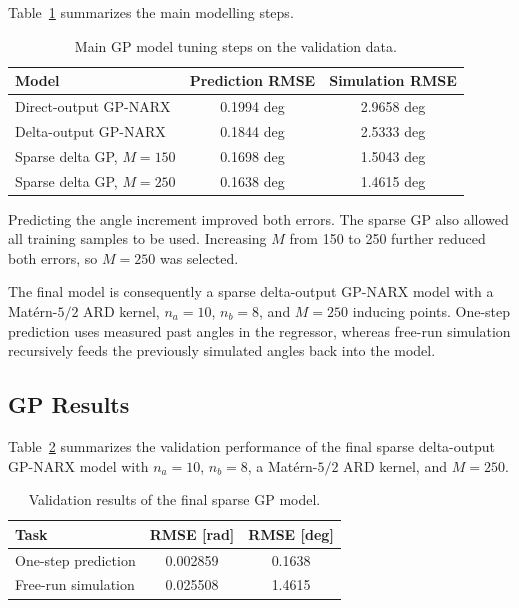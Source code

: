 Table~\ref{tab:gp_tuning} summarizes the main modelling steps.

\begin{table}[htbp]
\caption{Main GP model tuning steps on the validation data.}
\centering
\begin{tabular}{lcc}
\toprule
Model & Prediction RMSE & Simulation RMSE \\
\midrule
Direct-output GP-NARX & 0.1994 deg & 2.9658 deg \\
Delta-output GP-NARX & 0.1844 deg & 2.5333 deg \\
Sparse delta GP, \(M=150\) & 0.1698 deg & 1.5043 deg \\
Sparse delta GP, \(M=250\) & 0.1638 deg & 1.4615 deg \\
\bottomrule
\end{tabular}
\label{tab:gp_tuning}
\end{table}

Predicting the angle increment improved both errors. The sparse GP also
allowed all training samples to be used. Increasing \(M\) from 150 to
250 further reduced both errors, so \(M=250\) was selected.

The final model is consequently a sparse delta-output GP-NARX model
with a Mat\'ern-\(5/2\) ARD kernel, \(n_a=10\), \(n_b=8\), and
\(M=250\) inducing points. One-step prediction uses measured past
angles in the regressor, whereas free-run simulation recursively feeds
the previously simulated angles back into the model.


\subsection{GP Results}

Table~\ref{tab:gp_results} summarizes the validation performance of the
final sparse delta-output GP-NARX model with \(n_a=10\), \(n_b=8\), a
Mat\'ern-\(5/2\) ARD kernel, and \(M=250\).

\begin{table}[htbp]
\caption{Validation results of the final sparse GP model.}
\centering
\begin{tabular}{lcc}
\toprule
Task & RMSE [rad] & RMSE [deg] \\
\midrule
One-step prediction & 0.002859 & 0.1638 \\
Free-run simulation & 0.025508 & 1.4615 \\
\bottomrule
\end{tabular}
\label{tab:gp_results}
\end{table}

